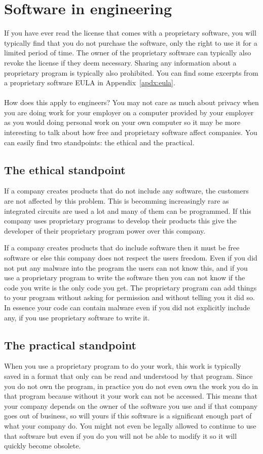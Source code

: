 \documentclass[12pt,a4paper]{article}
\begin{document}
\section{Software in engineering}
If you have ever read the license that comes with a proprietary software, you will typically find that you do not purchase the software, only the right to use it for a limited period of time. The owner of the proprietary software can typically also revoke the license if they deem necessary. Sharing any information about a proprietary program is typically also prohibited. You can find some excerpts from a proprietary software EULA in Appendix~\ref{apdx:eula}.
\\\\
How does this apply to engineers? You may not care as much about privacy when you are doing work for your employer on a computer provided by your employer as you would doing personal work on your own computer so it may be more interesting to talk about how free and proprietary software affect companies. You can easily find two standpoints: the ethical and the practical.

\subsection{The ethical standpoint}
If a company creates products that do not include any software, the customers are not affected by this problem. This is becomming increasingly rare as integrated circuits are used a lot and many of them can be programmed. If this company uses proprietary programs to develop their products this give the developer of their proprietary program power over this company.

If a company creates products that do include software then it must be free software or else this company does not respect the users freedom. Even if you did not put any malware into the program the users can not know this, and if you use a proprietary program to write the software then you can not know if the code you write is the only code you get. The proprietary program can add things to your program without asking for permission and without telling you it did so. In essence your code can contain malware even if you did not explicitly include any, if you use proprietary software to write it.

\subsection{The practical standpoint}
When you use a proprietary program to do your work, this work is typically saved in a format that only can be read and understood by that program. Since you do not own the program, in practice you do not even own the work you do in that program because without it your work can not be accessed. This means that your company depends on the owner of the software you use and if that company goes out of business, so will yours if this software is a significant enough part of what your company do. You might not even be legally allowed to continue to use that software but even if you do you will not be able to modify it so it will quickly become obsolete.
\end{document}
